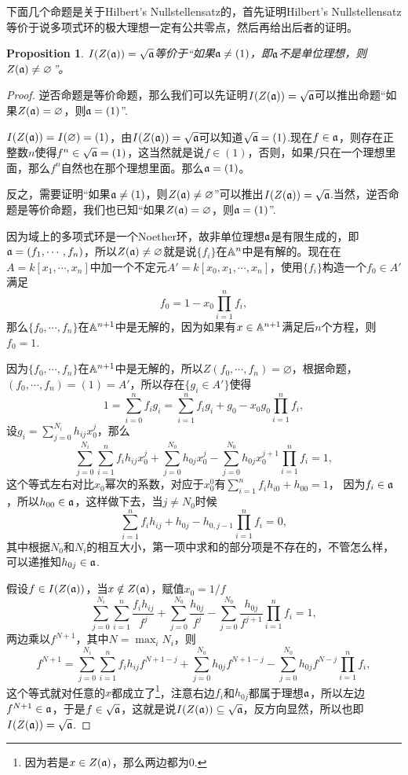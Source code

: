 \documentclass[9pt]{extbook}
\theoremstyle{plain}%
\newtheorem{pro}[defi]{Proposition}%
\begin{document}
下面几个命题是关于Hilbert's Nullstellensatz的，首先证明Hilbert's Nullstellensatz等价于说多项式环的极大理想一定有公共零点，然后再给出后者的证明。
\begin{pro}
\label{p1.10}
$I(Z(\mathfrak{a}))=\sqrt{\mathfrak{a}}$等价于“如果$\mathfrak{a}\neq(1)$，即$\mathfrak{a}$不是单位理想，则$Z(\mathfrak{a})\neq\varnothing$”。
\end{pro}
\begin{proof}
	逆否命题是等价命题，那么我们可以先证明$I(Z(\mathfrak{a}))=\sqrt{\mathfrak{a}}$可以推出命题“如果$Z(\mathfrak{a})=\varnothing$，则$\mathfrak{a}=(1)$”.

	$I(Z(\mathfrak{a}))=I(\varnothing)=(1)$，由$I(Z(\mathfrak{a}))=\sqrt{\mathfrak{a}}$可以知道$\sqrt{\mathfrak{a}}=(1)$.现在$f\in \mathfrak{a}$，则存在正整数$n$使得$f^n\in \sqrt{\mathfrak{a}}=(1)$，这当然就是说$f\in (1)$，否则，如果$f$只在一个理想里面，那么$f^n$自然也在那个理想里面。那么$\mathfrak{a}=(1)$。

	反之，需要证明“如果$\mathfrak{a}\neq(1)$，则$Z(\mathfrak{a})\neq\varnothing$”可以推出$I(Z(\mathfrak{a}))=\sqrt{\mathfrak{a}}$.当然，逆否命题是等价命题，我们也已知“如果$Z(\mathfrak{a})=\varnothing$，则$\mathfrak{a}=(1)$”.

	因为域上的多项式环是一个Noether环，故非单位理想$\mathfrak{a}$是有限生成的，即$\mathfrak{a}=(f_1,\cdots,f_n)$，所以$Z(\mathfrak{a})\neq \varnothing$就是说$\{f_i\}$在$\mathbb{A}^n$中是有解的。现在在$A=k[x_1,\cdots,x_n]$中加一个不定元$A'=k[x_0,x_1,\cdots,x_n]$，使用$\{f_i\}$构造一个$f_{0}\in A'$满足
	\[
		f_{0}=1-x_{0}\prod_{i=1}^nf_i,
	\]
	那么$\{f_0,\cdots,f_n\}$在$\mathbb{A}^{n+1}$中是无解的，因为如果有$x\in \mathbb{A}^{n+1}$满足后$n$个方程，则$f_{0}=1$.

	因为$\{f_0,\cdots,f_n\}$在$\mathbb{A}^{n+1}$中是无解的，所以$Z(f_0,\cdots,f_n)=\varnothing$，根据命题，$(f_0,\cdots,f_n)=(1)=A'$，所以存在$\{g_i\in A'\}$使得
	\[
		1=\sum_{i=0}^{n} f_ig_i=\sum_{i=1}^{n} f_ig_i+g_{0}-x_{0}g_{0}\prod_{i=1}^nf_i,
	\]
	设$g_i=\sum_{j=0}^{N_i}h_{ij}x_{0}^j$，那么
	\[
		\sum_{j=0}^{N_i}\sum_{i=1}^{n}f_ih_{ij}x_{0}^j+\sum_{j=0}^{N_{0}}h_{0j}x_{0}^j-\sum_{j=0}^{N_{0}}h_{0j}x_{0}^{j+1}\prod_{i=1}^nf_i=1,
	\]
	这个等式左右对比$x_0$幂次的系数，对应于$x_0^0$有$\sum_{i=1}^{n}f_ih_{i0}+h_{00}=1$，
	因为$f_i\in \mathfrak{a}$，所以$h_{00}\in \mathfrak{a}$，这样做下去，当$j\neq N_0$时候
	\[
		\sum_{i=1}^{n}f_ih_{ij}+h_{0j}-h_{0,j-1}\prod_{i=1}^nf_i=0,
	\]
	其中根据$N_0$和$N_i$的相互大小，第一项中求和的部分项是不存在的，不管怎么样，可以递推知$h_{0j}\in \mathfrak{a}$.

	假设$f\in I(Z(\mathfrak{a}))$，当$x\notin Z(\mathfrak{a})$，赋值$x_0=1/f$
	\[
		\sum_{j=0}^{N_i}\sum_{i=1}^{n}\frac{f_ih_{ij}}{f^j}+\sum_{j=0}^{N_{0}}\frac{h_{0j}}{f^j}-\sum_{j=0}^{N_{0}}\frac{h_{0j}}{f^{j+1}}\prod_{i=1}^nf_i=1,
	\]
	两边乘以$f^{N+1}$，其中$N=\max_iN_i$，则
	\[
		f^{N+1}=\sum_{j=0}^{N_i}\sum_{i=1}^{n}f_ih_{ij}f^{N+1-j}+\sum_{j=0}^{N_{0}}h_{0j}f^{N+1-j}-\sum_{j=0}^{N_{0}}h_{0j}f^{N-j}\prod_{i=1}^nf_i,
	\]
	这个等式就对任意的$x$都成立了\footnote{因为若是$x\in Z(\mathfrak{a})$，那么两边都为$0$.}，注意右边$f_i$和$h_{0j}$都属于理想$\mathfrak{a}$，所以左边$f^{N+1}\in \mathfrak{a}$，于是$f\in \sqrt{\mathfrak{a}}$，这就是说$I(Z(\mathfrak{a}))\subseteq \sqrt{\mathfrak{a}}$，反方向显然，所以也即$I(Z(\mathfrak{a}))=\sqrt{\mathfrak{a}}$.
\end{proof}
	
\end{document}
